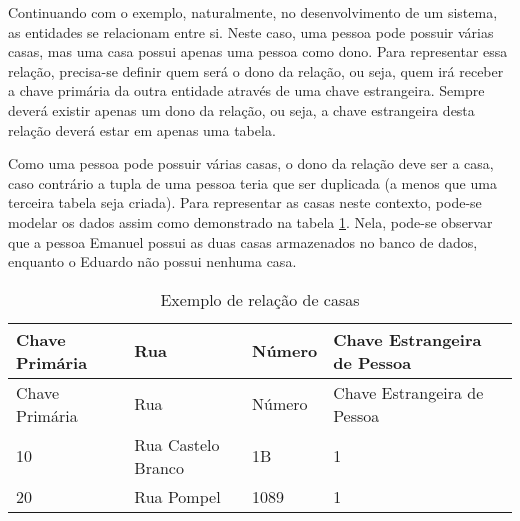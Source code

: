 Continuando com o exemplo, naturalmente, no desenvolvimento de um sistema, as entidades se relacionam entre si. Neste caso, uma pessoa pode possuir várias casas, mas uma casa possui apenas uma pessoa como dono. Para representar essa relação, precisa-se definir quem será o dono da relação, ou seja, quem irá receber a chave primária da outra entidade através de uma chave estrangeira. Sempre deverá existir apenas  um dono da relação, ou seja, a chave estrangeira desta relação deverá estar em apenas uma tabela.
    
Como uma pessoa pode possuir várias casas, o dono da relação deve ser a casa, caso contrário a tupla de uma pessoa teria que ser duplicada (a menos que uma terceira tabela seja criada). Para representar as casas neste contexto, pode-se modelar os dados assim como demonstrado na tabela \ref{tab: casa}. Nela, pode-se observar que a pessoa Emanuel possui as duas casas armazenados no banco de dados, enquanto o Eduardo não possui nenhuma casa.

\begin{longtable}[]{@{}llll@{}}
\caption{Exemplo de relação de casas \label{tab: casa}}\tabularnewline
\toprule
Chave Primária & Rua & Número & Chave Estrangeira de Pessoa\tabularnewline
\midrule
\endfirsthead
\toprule
Chave Primária & Rua & Número & Chave Estrangeira de Pessoa\tabularnewline
\midrule
\endhead
10 & Rua Castelo Branco & 1B & 1\tabularnewline
20 & Rua Pompel & 1089 & 1\tabularnewline
\bottomrule
\end{longtable}

